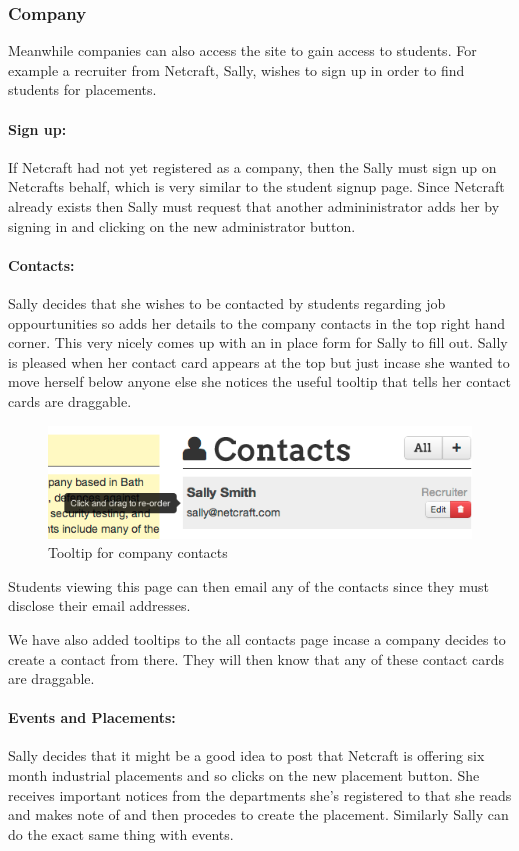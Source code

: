 \subsubsection{Company}
Meanwhile companies can also access the site to gain access to students. For example a recruiter from Netcraft, Sally, wishes to sign up in order to find students for placements.
  \paragraph{Sign up:}
    If Netcraft had not yet registered as a company, then the Sally must sign up on Netcrafts behalf, which is very similar to the student signup page.
    Since Netcraft already exists then Sally must request that another admininistrator adds her by signing in and clicking on the new administrator button.

  \paragraph{Contacts:}
    Sally decides that she wishes to be contacted by students regarding job oppourtunities so adds her details to the company contacts in the top right hand corner. This very nicely comes up with an in place form for Sally to fill out.
    Sally is pleased when her contact card appears at the top but just incase she wanted to move herself below anyone else she notices the useful tooltip that tells her contact cards are draggable.

    \begin{figure}[H]\centering
    \includegraphics[scale=0.5]{images/user_experiences/company/netcraft_company_contact_tooltip}
    \caption{Tooltip for company contacts}
    \end{figure}
    Students viewing this page can then email any of the contacts since they must disclose their email addresses.

    We have also added tooltips to the all contacts page incase a company decides to create a contact from there. They will then know that any of these contact cards are draggable.

  \paragraph{Events and Placements:}
    Sally decides that it might be a good idea to post that Netcraft is offering six month industrial placements and so clicks on the new placement button. 
    She receives important notices from the departments she's registered to that she reads and makes note of and then procedes to create the placement.
    Similarly Sally can do the exact same thing with events.

